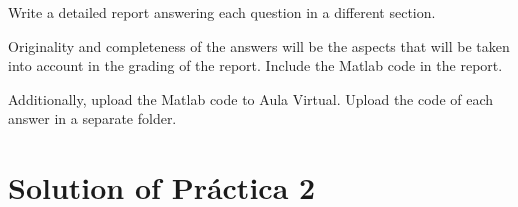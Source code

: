 \documentclass{article}
\begin{document}
\bigskip

\noindent
{\color{red} Write a detailed report answering each question in a different section. 

\bigskip

\noindent
Originality and completeness of the answers will be the aspects that will be taken into account in the grading of the report. Include the Matlab code in the report.

\bigskip

\noindent
 Additionally, upload the Matlab code to Aula Virtual. Upload the code of each answer in a separate folder. 
} 



\newpage

\section*{Solution of Pr\'actica 2}
\end{document}
